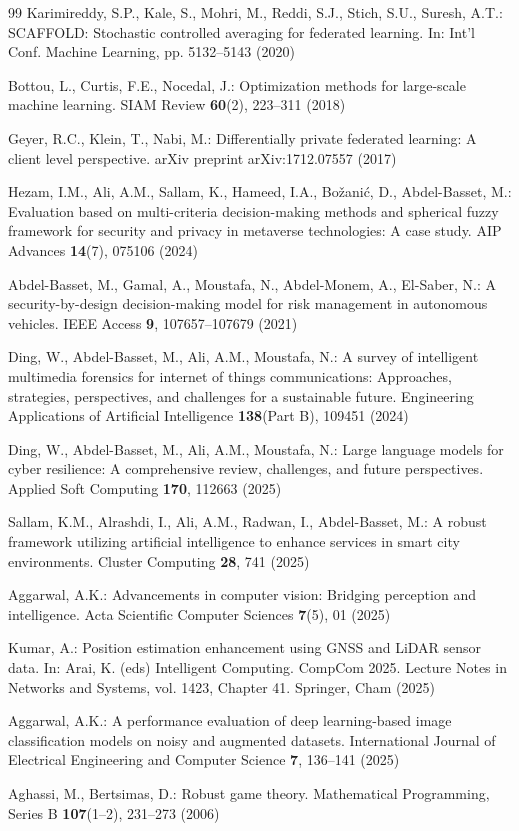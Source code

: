 \documentclass[12pt,a4paper]{article}
\newcommand{\rev}[1]{\textcolor{revcolor}{#1}}
\theoremstyle{definition}
\begin{document}
\begin{thebibliography}{99}
Karimireddy, S.P., Kale, S., Mohri, M., Reddi, S.J., Stich, S.U., Suresh, A.T.: SCAFFOLD: Stochastic controlled averaging for federated learning. In: Int'l Conf. Machine Learning, pp. 5132--5143 (2020)

Bottou, L., Curtis, F.E., Nocedal, J.: Optimization methods for large-scale machine learning. SIAM Review \textbf{60}(2), 223--311 (2018)

Geyer, R.C., Klein, T., Nabi, M.: Differentially private federated learning: A client level perspective. arXiv preprint arXiv:1712.07557 (2017)

\rev{Hezam, I.M., Ali, A.M., Sallam, K., Hameed, I.A., Bo\v{z}ani\'{c}, D., Abdel-Basset, M.: Evaluation based on multi-criteria decision-making methods and spherical fuzzy framework for security and privacy in metaverse technologies: A case study. AIP Advances \textbf{14}(7), 075106 (2024)}

\rev{Abdel-Basset, M., Gamal, A., Moustafa, N., Abdel-Monem, A., El-Saber, N.: A security-by-design decision-making model for risk management in autonomous vehicles. IEEE Access \textbf{9}, 107657--107679 (2021)}

\rev{Ding, W., Abdel-Basset, M., Ali, A.M., Moustafa, N.: A survey of intelligent multimedia forensics for internet of things communications: Approaches, strategies, perspectives, and challenges for a sustainable future. Engineering Applications of Artificial Intelligence \textbf{138}(Part B), 109451 (2024)}

\rev{Ding, W., Abdel-Basset, M., Ali, A.M., Moustafa, N.: Large language models for cyber resilience: A comprehensive review, challenges, and future perspectives. Applied Soft Computing \textbf{170}, 112663 (2025)}

\rev{Sallam, K.M., Alrashdi, I., Ali, A.M., Radwan, I., Abdel-Basset, M.: A robust framework utilizing artificial intelligence to enhance services in smart city environments. Cluster Computing \textbf{28}, 741 (2025)}

\rev{Aggarwal, A.K.: Advancements in computer vision: Bridging perception and intelligence. Acta Scientific Computer Sciences \textbf{7}(5), 01 (2025)}

\rev{Kumar, A.: Position estimation enhancement using GNSS and LiDAR sensor data. In: Arai, K. (eds) Intelligent Computing. CompCom 2025. Lecture Notes in Networks and Systems, vol. 1423, Chapter 41. Springer, Cham (2025)}

\rev{Aggarwal, A.K.: A performance evaluation of deep learning-based image classification models on noisy and augmented datasets. International Journal of Electrical Engineering and Computer Science \textbf{7}, 136--141 (2025)}

\rev{Aghassi, M., Bertsimas, D.: Robust game theory. Mathematical Programming, Series B \textbf{107}(1--2), 231--273 (2006)}

\end{thebibliography}
\end{document}
